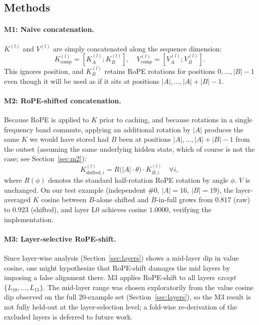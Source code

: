 \documentclass[11pt]{article}
\begin{document}
\subsection{Methods}

\paragraph{M1: Naive concatenation.} $K^{(l)}$ and $V^{(l)}$ are simply concatenated along the sequence dimension:
\[
K^{(l)}_{\text{comp}} = [K^{(l)}_A ; K^{(l)}_B],
\quad
V^{(l)}_{\text{comp}} = [V^{(l)}_A ; V^{(l)}_B].
\]
This ignores position, and $K^{(l)}_B$ retains RoPE rotations for positions $0, \dots, |B|-1$ even though it will be used as if it sits at positions $|A|, \dots, |A|+|B|-1$.

\paragraph{M2: RoPE-shifted concatenation.} Because RoPE is applied to $K$ prior to caching, and because rotations in a single frequency band commute, applying an additional rotation by $|A|$ produces the same $K$ we would have stored had $B$ been at positions $|A|, \dots, |A|+|B|-1$ from the outset (assuming the same underlying hidden state, which of course is not the case; see Section~\ref{sec:m2}):
\[
K^{(l)}_{\text{shifted}, i} = R\bigl( |A| \cdot \theta \bigr) \cdot K^{(l)}_{B, i}
\quad \forall i,
\]
where $R(\phi)$ denotes the standard half-rotation RoPE rotation by angle $\phi$. $V$ is unchanged. On our test example (independent \#0, $|A|=16$, $|B|=19$), the layer-averaged $K$ cosine between $B$-alone shifted and $B$-in-full grows from $0.817$ (raw) to $0.923$ (shifted), and layer L0 achieves cosine $1.0000$, verifying the implementation.

\paragraph{M3: Layer-selective RoPE-shift.} Since layer-wise analysis (Section~\ref{sec:layers}) shows a mid-layer dip in value cosine, one might hypothesize that RoPE-shift damages the mid layers by imposing a false alignment there. M3 applies RoPE-shift to all layers \emph{except} $\{L_{10}, \ldots, L_{15}\}$. The mid-layer range was chosen exploratorily from the value cosine dip observed on the full 20-example set (Section~\ref{sec:layers}), so the M3 result is not fully held-out at the layer-selection level; a fold-wise re-derivation of the excluded layers is deferred to future work.
\end{document}
